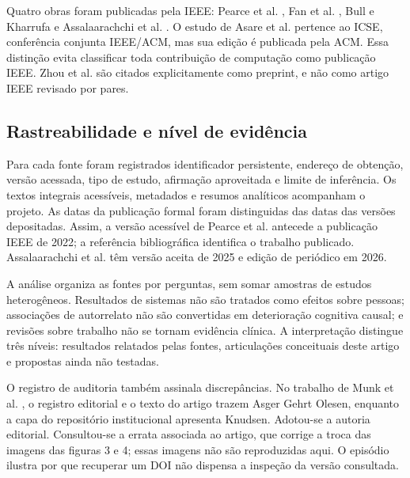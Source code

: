 \documentclass[11pt,a4paper]{article}
\begin{document}
Quatro obras foram publicadas pela IEEE: Pearce et al. \cite{pearce}, Fan et al. \cite{fan}, Bull e Kharrufa \cite{educacao} e Assalaarachchi et al. \cite{gestao}. O estudo de Asare et al. \cite{asare} pertence ao ICSE, conferência conjunta IEEE/ACM, mas sua edição é publicada pela ACM. Essa distinção evita classificar toda contribuição de computação como publicação IEEE. Zhou et al. \cite{zhou} são citados explicitamente como preprint, e não como artigo IEEE revisado por pares.

\subsection{Rastreabilidade e nível de evidência}
Para cada fonte foram registrados identificador persistente, endereço de obtenção, versão acessada, tipo de estudo, afirmação aproveitada e limite de inferência. Os textos integrais acessíveis, metadados e resumos analíticos acompanham o projeto. As datas da publicação formal foram distinguidas das datas das versões depositadas. Assim, a versão acessível de Pearce et al. antecede a publicação IEEE de 2022; a referência bibliográfica identifica o trabalho publicado. Assalaarachchi et al. têm versão aceita de 2025 e edição de periódico em 2026.

A análise organiza as fontes por perguntas, sem somar amostras de estudos heterogêneos. Resultados de sistemas não são tratados como efeitos sobre pessoas; associações de autorrelato não são convertidas em deterioração cognitiva causal; e revisões sobre trabalho não se tornam evidência clínica. A interpretação distingue três níveis: resultados relatados pelas fontes, articulações conceituais deste artigo e propostas ainda não testadas.

O registro de auditoria também assinala discrepâncias. No trabalho de Munk et al. \cite{munk}, o registro editorial e o texto do artigo trazem Asger Gehrt Olesen, enquanto a capa do repositório institucional apresenta Knudsen. Adotou-se a autoria editorial. Consultou-se a errata associada ao artigo, que corrige a troca das imagens das figuras 3 e 4; essas imagens não são reproduzidas aqui. O episódio ilustra por que recuperar um DOI não dispensa a inspeção da versão consultada.
\end{document}
